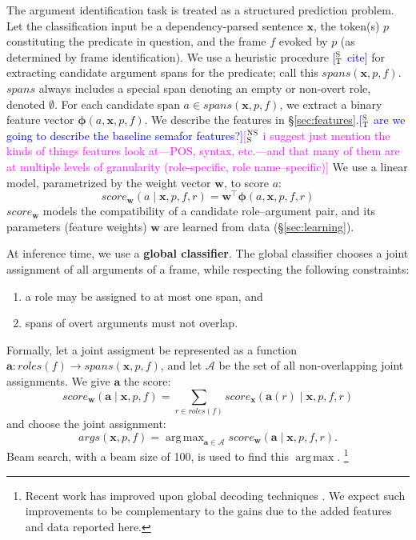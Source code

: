 \documentclass[11pt,a4paper]{article}
\DeclareMathOperator*{\argmax}{arg\,max}
\newcommand{\ensuretext}[1]{#1}
\newcommand{\nssmarker}{\ensuretext{\textcolor{magenta}{\ensuremath{^{\textsc{NS}}_{\textsc{S}}}}}}
\newcommand{\stmarker}{\ensuretext{\textcolor{blue}{\ensuremath{^{\textsc{S}}_{\textsc{T}}}}}}
\newcommand{\arkcomment}[3]{\ensuretext{\textcolor{#3}{[#1 #2]}}}
\newcommand{\nss}[1]{\arkcomment{\nssmarker}{#1}{magenta}}
\newcommand{\st}[1]{\arkcomment{\stmarker}{#1}{blue}}
\newcommand{\term}[1]{\textbf{#1}} %
\begin{document}
The argument identification task is treated as a structured prediction problem.
Let the classification input be a dependency-parsed sentence $\mathbf{x}$, 
the token(s) $p$ constituting the predicate in question, and the frame $f$ evoked by $p$
(as determined by frame identification). 
We use a heuristic procedure \st{cite} for extracting candidate argument spans 
for the predicate; call this $\textit{spans}(\mathbf{x}, p, f)$.
$\textit{spans}$ always includes a special span denoting an empty or non-overt role, denoted $\emptyset$. 
For each candidate span $a \in \textit{spans}(\mathbf{x}, p, f)$, we extract a binary feature vector 
$\mathbf{\phi}(a, \mathbf{x}, p, f)$.
We describe the features in \S\ref{sec:features}.\st{are we going to describe the baseline semafor features?}\nss{i suggest just mention the kinds of things features look at---POS, syntax, etc.---and that many of them are at multiple levels of granularity (role-specific, role name--specific)}
We use a linear model, parametrized by the weight vector $\mathbf{w}$, to score $a$:
\begin{equation}
\textit{score}_\mathbf{w}(a \mid \mathbf{x}, p, f, r) = \mathbf{w}^\top \mathbf{\phi}(a, \mathbf{x}, p, f, r)
\end{equation}
$\textit{score}_\mathbf{w}$ models the compatibility  of a candidate
role--argument pair, and its parameters (feature weights) $\mathbf{w}$ are
learned from data (\S\ref{sec:learning}).

At inference time, we use a \term{global classifier}.
The global classifier chooses a joint assignment of all arguments of a frame, while respecting the following constraints:
\begin{enumerate}
  \item a role may be assigned to at most one span, and
  \item spans of overt arguments must not overlap.
\end{enumerate}
Formally, let a joint assigment be represented as a function $\mathbf{a}: \textit{roles}(f) \rightarrow \textit{spans}(\mathbf{x}, p, f)$, %
 and let $\mathcal{A}$ be the set of all non-overlapping joint assignments.
We give $\mathbf{a}$ the score:
\begin{equation}
\textit{score}_{\mathbf{w}}(\mathbf{a} \mid \mathbf{x}, p, f) =
    \sum_{r \in \textit{roles}(f)}{\textit{score}_\mathbf{x}(\mathbf{a}(r) \mid \mathbf{x}, p, f, r)}
\end{equation}
and choose the joint assignment:
\begin{equation}
\textit{args}(\mathbf{x}, p, f) =
    \argmax_{\mathbf{a} \in \mathcal{A}} {
        \textit{score}_{\mathbf{w}}(\mathbf{a} \mid \mathbf{x}, p, f, r)
    }.
\end{equation}
Beam search, with a beam size of 100, is used to find this $\argmax$.%
\footnote{Recent work has improved upon global decoding techniques \citep{tackstrom-15}.
We expect such improvements to be complementary to the gains due to the added features and data reported here.}
\end{document}
